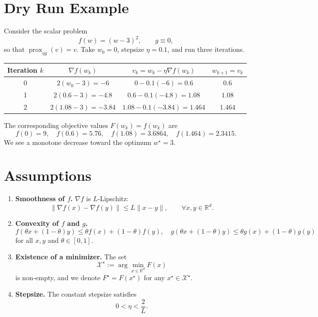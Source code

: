\documentclass{article}
\newcommand{\prox}{\operatorname{prox}}
\newcommand{\R}{\mathbb{R}}
\begin{document}
\section*{Dry Run Example}
Consider the scalar problem
\[
f(w)=(w-3)^{2},\qquad g\equiv0,
\]
so that $\prox_{\eta g}(v)=v$.  Take $w_{0}=0$, stepsize $\eta=0.1$, and run three iterations.

\begin{center}
\begin{tabular}{c|c|c|c}
Iteration $k$ & $\nabla f(w_{k})$ & $v_{k}=w_{k}-\eta\nabla f(w_{k})$ & $w_{k+1}=v_{k}$ \\ \hline
0 & $2(w_{0}-3)=-6$ & $0-0.1(-6)=0.6$ & $0.6$ \\ 
1 & $2(0.6-3)=-4.8$ & $0.6-0.1(-4.8)=1.08$ & $1.08$ \\ 
2 & $2(1.08-3)=-3.84$ & $1.08-0.1(-3.84)=1.464$ & $1.464$ \\ 
\end{tabular}
\end{center}
The corresponding objective values $F(w_{k})=f(w_{k})$ are
\[
f(0)=9,\quad f(0.6)=5.76,\quad f(1.08)=3.6864,\quad f(1.464)=2.3415.
\]
We see a monotone decrease toward the optimum $w^{\star}=3$.

\section*{Assumptions}
\begin{enumerate}[label={A\arabic*}:, leftmargin=*, noitemsep]
\item \textbf{Smoothness of $f$.} $\nabla f$ is $L$‑Lipschitz:
\[
\|\nabla f(x)-\nabla f(y)\|\le L\|x-y\|,\qquad\forall x,y\in\R^{d}.
\tag{A1}
\]
\item \textbf{Convexity of $f$ and $g$.}
\[
f(\theta x+(1-\theta)y)\le \theta f(x)+(1-\theta)f(y),\quad
g(\theta x+(1-\theta)y)\le \theta g(x)+(1-\theta)g(y)
\]
for all $x,y$ and $\theta\in[0,1]$.
\item \textbf{Existence of a minimizer.} The set
\[
\mathcal{X}^{\star}:=\arg\min_{x\in\R^{d}}F(x)
\]
is non‑empty, and we denote $F^{\star}=F(x^{\star})$ for any $x^{\star}\in\mathcal{X}^{\star}$.
\item \textbf{Stepsize.} The constant stepsize satisfies
\[
0<\eta<\frac{2}{L}.
\tag{A4}
\]
\end{enumerate}
\end{document}
